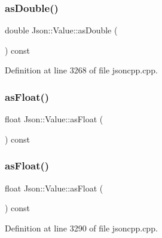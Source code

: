 \hypertarget{class_json_1_1_value_afd24002a18aef907ad746b1cb9eda0a2}{}\label{class_json_1_1_value_afd24002a18aef907ad746b1cb9eda0a2} 
\subsubsection{\texorpdfstring{as\+Double()}{asDouble()}\hspace{0.1cm}{\footnotesize\ttfamily [2/2]}}
{\footnotesize\ttfamily double Json\+::\+Value\+::as\+Double (\begin{DoxyParamCaption}{ }\end{DoxyParamCaption}) const}



Definition at line 3268 of file jsoncpp.\+cpp.

\hypertarget{class_json_1_1_value_af3a4d10bf575fabdc5440a7135c9649c}{}\label{class_json_1_1_value_af3a4d10bf575fabdc5440a7135c9649c} 
\subsubsection{\texorpdfstring{as\+Float()}{asFloat()}\hspace{0.1cm}{\footnotesize\ttfamily [1/2]}}
{\footnotesize\ttfamily float Json\+::\+Value\+::as\+Float (\begin{DoxyParamCaption}{ }\end{DoxyParamCaption}) const}

\hypertarget{class_json_1_1_value_af3a4d10bf575fabdc5440a7135c9649c}{}\label{class_json_1_1_value_af3a4d10bf575fabdc5440a7135c9649c} 
\subsubsection{\texorpdfstring{as\+Float()}{asFloat()}\hspace{0.1cm}{\footnotesize\ttfamily [2/2]}}
{\footnotesize\ttfamily float Json\+::\+Value\+::as\+Float (\begin{DoxyParamCaption}{ }\end{DoxyParamCaption}) const}



Definition at line 3290 of file jsoncpp.\+cpp.


